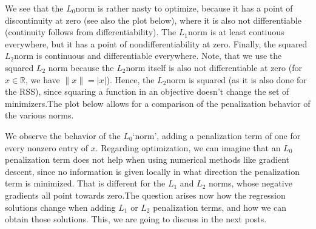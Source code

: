 \documentclass[letterpaper,10pt,english]{jupyterBook}
\begin{document}
\sphinxAtStartPar
We see that the \(L_0\)\sphinxhyphen{}norm is rather nasty to optimize, because it has a point of discontinuity at zero (see also the plot below), where it is also not differentiable (continuity follows from differentiability). The \(L_1\)\sphinxhyphen{}norm is at least contiuous everywhere, but it has a point of nondifferentiability at zero. Finally, the squared \(L_2\)\sphinxhyphen{}norm is continuous and differentiable everywhere. Note, that we use the squared \(L_2\) norm because the \(L_2\)\sphinxhyphen{}norm itself is also not differentiable at zero (for \(x\in\mathbb{R}\), we have \(\lVert x\rVert = \lvert x\rvert\)). Hence, the \(L_2\)\sphinxhyphen{}norm is squared (as it is also done for the RSS), since squaring a function in an objective doesn’t change the set of minimizers.The plot below allows for a comparison of the penalization behavior of the various norms.
\begin{center}\end{center}
\sphinxAtStartPar
We observe the behavior of the \(L_0\)\sphinxhyphen{}‘norm’, adding a penalization term of one for every nonzero entry of \(x\). Regarding optimization, we can imagine that an \(L_0\) penalization term does not help when using numerical methods like gradient descent, since no information is given locally in what direction the penalization term is minimized. That is different for the \(L_1\) and \(L_2\) norms, whose negative gradients all point towards zero.The question arises now how the regression solutions change when adding \(L_1\) or \(L_2\) penalization terms, and how we can obtain those solutions. This, we are going to discuss in the next posts.
\end{document}
